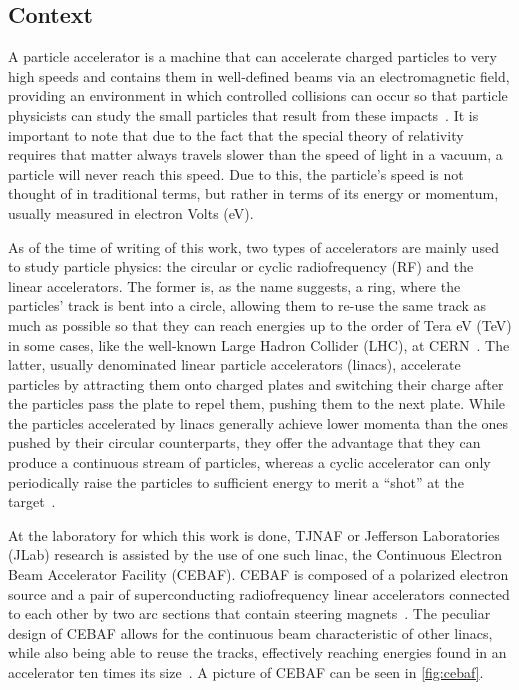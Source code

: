  \label{sec:prob}
\subsection{Context} \label{ssec:prob_context}
A particle accelerator is a machine that can accelerate charged particles to very high speeds and contains them in well-defined beams via an electromagnetic field, providing an environment in which controlled collisions can occur so that particle physicists can study the small particles that result from these impacts~\cite{leduff2005longitudinal}.
It is important to note that due to the fact that the special theory of relativity requires that matter always travels slower than the speed of light in a vacuum, a particle will never reach this speed.
Due to this, the particle's speed is not thought of in traditional terms, but rather in terms of its energy or momentum, usually measured in electron Volts (eV).

As of the time of writing of this work, two types of accelerators are mainly used to study particle physics: the circular or cyclic radiofrequency (RF) and the linear accelerators.
The former is, as the name suggests, a ring, where the particles' track is bent into a circle, allowing them to re-use the same track as much as possible so that they can reach energies up to the order of Tera eV (TeV) in some cases, like the well-known Large Hadron Collider (LHC), at CERN~\cite{leduff2005longitudinal}.
The latter, usually denominated linear particle accelerators (linacs), accelerate particles by attracting them onto charged plates and switching their charge after the particles pass the plate to repel them, pushing them to the next plate.
While the particles accelerated by linacs generally achieve lower momenta than the ones pushed by their circular counterparts, they offer the advantage that they can produce a continuous stream of particles, whereas a cyclic accelerator can only periodically raise the particles to sufficient energy to merit a ``shot'' at the target~\cite{pinchoff2005introduction}.

At the laboratory for which this work is done, TJNAF or Jefferson Laboratories (JLab) research is assisted by the use of one such linac, the Continuous Electron Beam Accelerator Facility (CEBAF).
CEBAF is composed of a polarized electron source and a pair of superconducting radiofrequency linear accelerators connected to each other by two arc sections that contain steering magnets~\cite{leemann2001continuous}.
The peculiar design of CEBAF allows for the continuous beam characteristic of other linacs, while also being able to reuse the tracks, effectively reaching energies found in an accelerator ten times its size~\cite{leemann2001continuous}.
A picture of CEBAF can be seen in \ref{fig:cebaf}.

